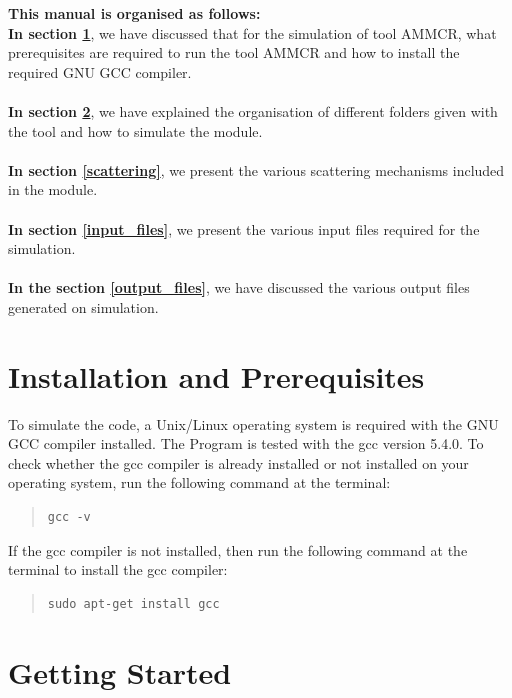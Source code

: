 \documentclass[12pt]{article}
\begin{document}
\textbf{This manual is organised as follows:} \\
\textbf{In section \ref{installation}}, we have discussed that for the simulation of tool AMMCR, what prerequisites are required to run the tool AMMCR and how to install the required GNU GCC compiler.  \\  \\
\textbf{In section \ref{getting_started}}, we have explained the organisation of different folders given with the tool and how to simulate the module. \\ \\
\textbf{In section \ref{scattering}}, we present the various scattering mechanisms included in the module. \\ \\
\textbf{In section \ref{input_files}}, we present the various input files required for the simulation. \\ \\
\textbf{In the section \ref{output_files}}, we have discussed the various output files generated on simulation. \\

\section{Installation and Prerequisites} \label{installation}
To simulate the code, a Unix/Linux operating system is required with the GNU GCC compiler installed. The Program is tested with the gcc version 5.4.0.
\newline To check whether the gcc compiler is already installed or not installed on your operating system, run the following command at the terminal:

\begin{quote}
\begin{verbatim}
gcc -v
\end{verbatim}
\end{quote}

If the gcc compiler is not installed, then run the following command at the terminal to install the gcc compiler: 

\begin{quote}
\begin{verbatim}
sudo apt-get install gcc
\end{verbatim}
\end{quote}


\section{Getting Started} \label{getting_started}
\end{document}

